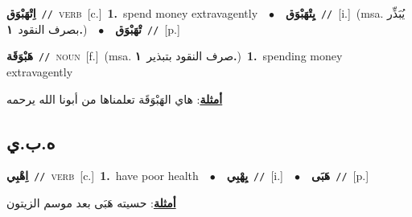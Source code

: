 \documentclass[10pt,a4paper,twoside]{article} %
\begin{document}
\begin{multicols}{2}
{{{{{{{{{\setlength\topsep{0pt}\textbf{\foreignlanguage{arabic}{اِتْهَبْوَق}}\ {\color{gray}\texttt{//}\color{black}}\ \textsc{verb}\ [c.]\ \textbf{1.}~spend money extravagently\ \ $\bullet$\ \ \setlength\topsep{0pt}\textbf{\foreignlanguage{arabic}{يِتْهَبْوَق}}\ {\color{gray}\texttt{//}\color{black}}\ [i.]\ \color{gray}(msa. \foreignlanguage{arabic}{يُبَذِّر بصرف النقود}~\foreignlanguage{arabic}{\textbf{١.}})\color{black}\ \ $\bullet$\ \ \setlength\topsep{0pt}\textbf{\foreignlanguage{arabic}{تْهَبْوَق}}\ {\color{gray}\texttt{//}\color{black}}\ [p.]\ 

{\setlength\topsep{0pt}\textbf{\foreignlanguage{arabic}{هَبْوَقَة}}\ {\color{gray}\texttt{//}\color{black}}\ \textsc{noun}\ [f.]\ \color{gray}(msa. \foreignlanguage{arabic}{صرف النقود بتبذير}~\foreignlanguage{arabic}{\textbf{١.}})\color{black}\ \textbf{1.}~spending money extravagently\  \begin{flushright}\color{gray}\foreignlanguage{arabic}{\textbf{\underline{\foreignlanguage{arabic}{أمثلة}}}: هاي الهَبْوَقَة تعلمناها من أبونا الله يرحمه}\end{flushright}\color{black}} \vspace{2mm}

\vspace{-3mm}
\subsection*{\color{blue}\foreignlanguage{arabic}{ه.ب.ي}\color{blue}{}} 

{\setlength\topsep{0pt}\textbf{\foreignlanguage{arabic}{اِهْبِي}}\ {\color{gray}\texttt{//}\color{black}}\ \textsc{verb}\ [c.]\ \textbf{1.}~have poor health\ \ $\bullet$\ \ \setlength\topsep{0pt}\textbf{\foreignlanguage{arabic}{يِهْبِي}}\ {\color{gray}\texttt{//}\color{black}}\ [i.]\ \ $\bullet$\ \ \setlength\topsep{0pt}\textbf{\foreignlanguage{arabic}{هَبَى}}\ {\color{gray}\texttt{//}\color{black}}\ [p.]\  \begin{flushright}\color{gray}\foreignlanguage{arabic}{\textbf{\underline{\foreignlanguage{arabic}{أمثلة}}}: حسيته هَبَى  بعد موسم الزيتون}\end{flushright}\color{black}} \vspace{2mm}

}}}}}}}}}
\end{multicols}
\end{document}
